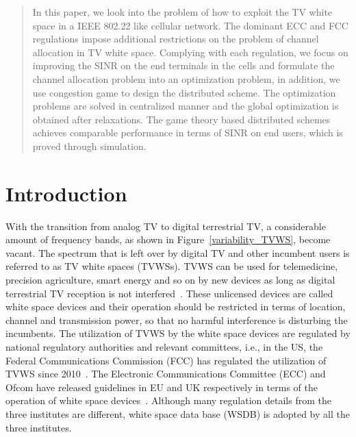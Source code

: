 \documentclass[times]{ettauth}
\newcommand{\ie}{i.e., }
\theoremstyle{mytheoremstyle}
\theoremstyle{mytheoremstyle}
\theoremstyle{mytheoremstyle}
\begin{document}




\begin{abstract}

In this paper, we look into the problem of how to exploit the TV white space in a IEEE 802.22 like cellular network.
The dominant ECC and FCC regulations impose additional restrictions on the problem of channel allocation in TV white space.
Complying with each regulation, we focus on improving the SINR on the end terminals in the cells and formulate the channel allocation problem into an optimization problem, in addition, we use congestion game to design the distributed scheme.
The optimization problems are solved in centralized manner and the global optimization is obtained after relaxations.
The game theory based distributed schemes achieves comparable performance in terms of SINR on end users, which is proved through simulation.

\end{abstract}

\maketitle
\graphicspath{
{../figures/03_distributedChannelAllocation/}{../figure/03_distributedChannelAllocation/1mar2016/}{../figure/03_distributedChannelAllocation/1mar2016/radius_6000_runtimes_50/}{../../channel-power-allocation-802.22/}{../../channel-power-allocation-802.22/plots/}
}

\section{Introduction}



With the transition from analog TV to digital terrestrial TV, a considerable amount of frequency bands, as shown in Figure~\ref{variability_TVWS}, become vacant.
The spectrum that is left over by digital TV and other incumbent users is referred to as TV white spaces (TVWSs).
TVWS can be used for telemedicine, precision agriculture, smart energy and so on by new devices as long as digital terrestrial TV reception is not interfered~\cite{FCC_2010_sedond_memorandumm}. 
These unlicensed devices are called white space devices and their operation should be restricted in terms of location, channel and transmission power, so that no harmful interference is disturbing the incumbents.
The utilization of TVWS by the white space devices are regulated by national regulatory authorities and relevant committees, \ie in the US, the Federal Communications Commission (FCC) has regulated the utilization of TVWS since 2010~\cite{FCC_2010_sedond_memorandumm}. 
The Electronic Communications Committee (ECC) and Ofcom have released guidelines in EU and UK respectively in terms of the operation of white space devices~\cite{ECC236, ofcom15}.
Although many regulation details from the three institutes are different, white space data base (WSDB) is adopted by all the three institutes.
\end{document}

